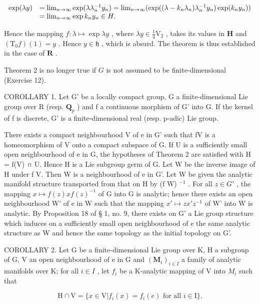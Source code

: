 \[
\begin{array}{r l} \exp (\lambda y) & = \lim _ {n \to \infty} \exp (\lambda \lambda_ {n} ^ {- 1} y _ {n}) = \lim _ {n \to \infty} (\exp ((\lambda - k _ {n} \lambda_ {n}) \lambda_ {n} ^ {- 1} y _ {n}) \exp (k _ {n} y _ {n})) \\ & = \lim _ {n \to \infty} \exp k _ {n} y _ {n} \in H. \end{array}
\]

Hence the mapping \(f \colon \lambda \mapsto \exp \lambda y\) , where \(\lambda y \in \frac{1}{4} \mathrm{V}_2\) , takes its values in \(\mathbf{H}\) and \((\mathrm{T}_0f)(1) = y\) . Hence \(y \in \mathfrak{h}\) , which is absurd. The theorem is thus established in the case of \(\mathbf{R}\) .

Theorem 2 is no longer true if \(G\) is not assumed to be finite-dimensional (Exercise 12).

COROLLARY 1. Let G' be a locally compact group, G a finite-dimensional Lie group over R (resp. \(\mathbf{Q}_{p}\) ) and f a continuous morphism of G' into G. If the kernel of f is discrete, G' is a finite-dimensional real (resp. p-adic) Lie group.

There exists a compact neighbourhood V of e in G' such that f\textbar V is a homeomorphism of V onto a compact subspace of G. If U is a sufficiently small open neighbourhood of e in G, the hypotheses of Theorem 2 are satisfied with H = f(V) ∩ U. Hence H is a Lie subgroup germ of G. Let W be the inverse image of H under f \textbar{} V. Then W is a neighbourhood of e in G'. Let W be given the analytic manifold structure transported from that on H by (f \textbar{} W) \(^{-1}\) . For all \(z \in G'\) , the mapping \(x \mapsto f(z)xf(z)^{-1}\) of G into G is analytic; hence there exists an open neighbourhood W' of e in W such that the mapping \(x' \mapsto zx'z^{-1}\) of W' into W is analytic. By Proposition 18 of § 1, no. 9, there exists on G' a Lie group structure which induces on a sufficiently small open neighbourhood of e the same analytic structure as W and hence the same topology as the initial topology on G'.

COROLLARY 2. Let G be a finite-dimensional Lie group over K, H a subgroup of G, V an open neighbourhood of e in G and \((\mathbf{M}_{i})_{i\in I}\) a family of analytic manifolds over K; for all \(i\in I\) , let \(f_{i}\) be a K-analytic mapping of V into \(M_{i}\) such that

\[
\mathrm{H} \cap \mathrm{V} = \{x \in \mathrm{V} | f _ {i} (x) = f _ {i} (e) \text {   for   all   } i \in \mathrm{I} \}.
\]

